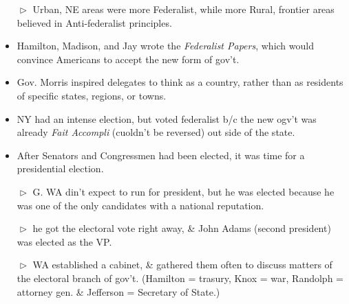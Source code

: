 \documentclass[10pt]{article}
\begin{document}
\begin{flushleft}
\begin{multicols}{2}
\begin{itemize}
\item[$\vartriangleright$] Urban, NE areas were more Federalist, while more Rural, frontier areas believed in Anti-federalist principles.
\item Hamilton, Madison, and Jay wrote the \textit{Federalist Papers}, which would convince Americans to accept the new form of gov't.
\item Gov. Morris inspired delegates to think as a country, rather than as residents of specific states, regions, or towns.
\item NY had an intense election, but voted federalist b/c the new ogv't was already \textit{Fait Accompli} (cuoldn't be reversed) out side of the state.
\item After Senators and Congressmen had been elected, it was time for a presidential election.
\item[$\vartriangleright$] G. WA din't expect to run for president, but he was elected because he was one of the only candidates with a national reputation.
\item[$\vartriangleright$] he got the electoral vote right away, \& John Adams (second president) was elected as the VP.
\item[$\vartriangleright$] WA established a cabinet, \& gathered them often to discuss matters of the electoral branch of gov't. (Hamilton = trasury, Knox = war, Randolph = attorney gen. \& Jefferson = Secretary of State.)
\end{itemize}

\end{multicols}

\end{flushleft}
\end{document}
